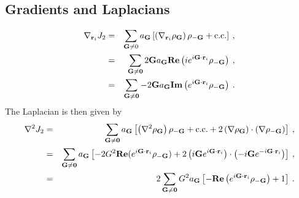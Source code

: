 \subsection{Gradients and Laplacians}
\begin{eqnarray}
\nabla_{\mathbf{r}_i} J_2 & = & \sum_{\mathbf{G} \neq 0} a_{\mathbf{G}} \left[\left(\nabla_{\mathbf{r}_i}\rho_{\mathbf{G}}\right) \rho_{-\mathbf{G}} + \text{c.c.}\right]\:, \\
& = & \sum_{\mathbf{G}\neq \mathbf{0}} 2\mathbf{G} a_{\mathbf{G}} \mathbf{Re}\left(i e^{i\mathbf{G}\cdot\mathbf{r}_i} \rho_{-\mathbf{G}} \right)\:, \\
& = & \sum_{\mathbf{G}\neq \mathbf{0}} -2\mathbf{G} a_{\mathbf{G}}\mathbf{Im}\left(e^{i\mathbf{G}\cdot\mathbf{r}_i} \rho_{-\mathbf{G}} \right)\:.
\end{eqnarray}
The Laplacian is then given by
\begin{eqnarray}
  \nabla^2 J_2 & = & \sum_{\mathbf{G}\neq\mathbf{0}} a_{\mathbf{G}} \left[\left(\nabla^2 \rho_{\mathbf{G}}\right) \rho_{-\mathbf{G}} + \text{c.c.} 
  + 2\left(\nabla \rho_{\mathbf{G}})\cdot(\nabla \rho_{-\mathbf{G}}\right)\right]\:, \\
& = & \sum_{\mathbf{G}\neq\mathbf{0}} a_{\mathbf{G}} \left[ -2G^2\mathbf{Re}(e^{i\mathbf{G}\cdot\mathbf{r}_i}\rho_{-\mathbf{G}}) + 
    2\left(i\mathbf{G} e^{i\mathbf{G}\cdot\mathbf{r}_i}\right) \cdot \left(-i\mathbf{G} e^{-i\mathbf{G}\cdot\mathbf{r}_i}\right)
\right]\:, \\
& = & 2 \sum_{\mathbf{G}\neq\mathbf{0}} G^2 a_{\mathbf{G}}  \left[-\mathbf{Re}\left(e^{i\mathbf{G}\cdot\mathbf{r}_i}\rho_{-\mathbf{G}}\right) + 1\right]\:. 
\end{eqnarray}

